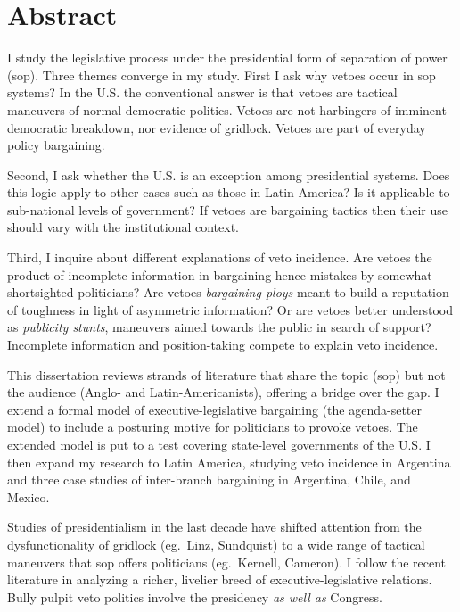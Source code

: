\chapter{Abstract}

I study the legislative process under the presidential form of separation of power (sop).  Three themes converge in my study.  First I ask why vetoes occur in sop systems?  In the U.S. the conventional answer is that vetoes are tactical maneuvers of normal democratic politics.  Vetoes are not harbingers of imminent democratic breakdown, nor evidence of gridlock.  Vetoes are part of everyday policy bargaining.  

Second, I ask whether the U.S. is an exception among presidential systems.  Does this logic apply to other cases such as those in Latin America?  Is it applicable to sub-national levels of government?  If vetoes are bargaining tactics then their use should vary with the institutional context.  

Third, I inquire about different explanations of veto incidence.  Are vetoes the product of incomplete information in bargaining hence mistakes by somewhat shortsighted politicians?  Are vetoes \emph{bargaining ploys} meant to build a reputation of toughness in light of asymmetric information?  Or are vetoes better understood as \emph{publicity stunts}, maneuvers aimed towards the public in search of support?  Incomplete information and position-taking compete to explain veto incidence.  

This dissertation reviews strands of literature that share the topic (sop) but not the audience (Anglo- and Latin-Americanists), offering a bridge over the gap.  I extend a formal model of executive-legislative bargaining (the agenda-setter model) to include a posturing motive for politicians to provoke vetoes.  The extended model is put to a test covering state-level governments of the U.S.  I then expand my research to Latin America, studying veto incidence in Argentina and three case studies of inter-branch bargaining in Argentina, Chile, and Mexico.  

Studies of presidentialism in the last decade have shifted attention from the dysfunctionality of gridlock (eg.\ Linz, Sundquist) to a wide range of tactical maneuvers that sop offers politicians (eg.\ Kernell, Cameron).  I follow the recent literature in analyzing a richer, livelier breed of executive-legislative relations.  Bully pulpit veto politics involve the presidency \emph{as well as} Congress.  
